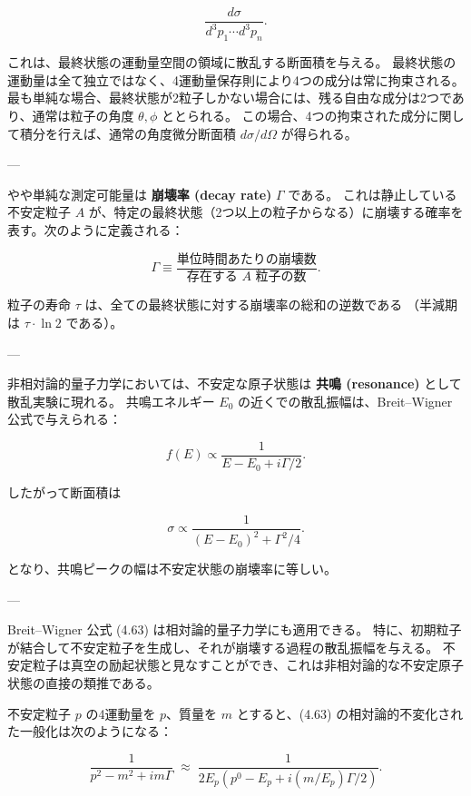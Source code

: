 \documentclass[a4paper,12pt]{article}
\begin{document}
\[
\frac{d\sigma}{d^3p_1 \cdots d^3p_n}.
\]

これは、最終状態の運動量空間の領域に散乱する断面積を与える。  
最終状態の運動量は全て独立ではなく、4運動量保存則により4つの成分は常に拘束される。  
最も単純な場合、最終状態が2粒子しかない場合には、残る自由な成分は2つであり、通常は粒子の角度 $\theta,\phi$ ととられる。  
この場合、4つの拘束された成分に関して積分を行えば、通常の角度微分断面積 $d\sigma/d\Omega$ が得られる。

---

やや単純な測定可能量は \textbf{崩壊率 (decay rate)} $\Gamma$ である。  
これは静止している不安定粒子 $A$ が、特定の最終状態（2つ以上の粒子からなる）に崩壊する確率を表す。次のように定義される：

\begin{equation}
\Gamma \equiv 
\frac{\text{単位時間あたりの崩壊数}}
{\text{存在する $A$ 粒子の数}}.
\tag{4.62}
\end{equation}

粒子の寿命 $\tau$ は、全ての最終状態に対する崩壊率の総和の逆数である
（半減期は $\tau \cdot \ln 2$ である）。

---

非相対論的量子力学においては、不安定な原子状態は \textbf{共鳴 (resonance)} として散乱実験に現れる。  
共鳴エネルギー $E_0$ の近くでの散乱振幅は、Breit–Wigner 公式で与えられる：

\begin{equation}
f(E) \propto \frac{1}{E - E_0 + i\Gamma/2}.
\tag{4.63}
\end{equation}

したがって断面積は

\begin{equation}
\sigma \propto \frac{1}{(E - E_0)^2 + \Gamma^2/4}.
\end{equation}

となり、共鳴ピークの幅は不安定状態の崩壊率に等しい。

---

Breit–Wigner 公式 (4.63) は相対論的量子力学にも適用できる。  
特に、初期粒子が結合して不安定粒子を生成し、それが崩壊する過程の散乱振幅を与える。  
不安定粒子は真空の励起状態と見なすことができ、これは非相対論的な不安定原子状態の直接の類推である。  

不安定粒子 $p$ の4運動量を $p$、質量を $m$ とすると、(4.63) の相対論的不変化された一般化は次のようになる：

\begin{equation}
\frac{1}{p^2 - m^2 + im\Gamma}
\;\approx\;
\frac{1}{2E_p(p^0 - E_p + i(m/E_p)\Gamma/2)}.
\tag{4.64}
\end{equation}
\end{document}
